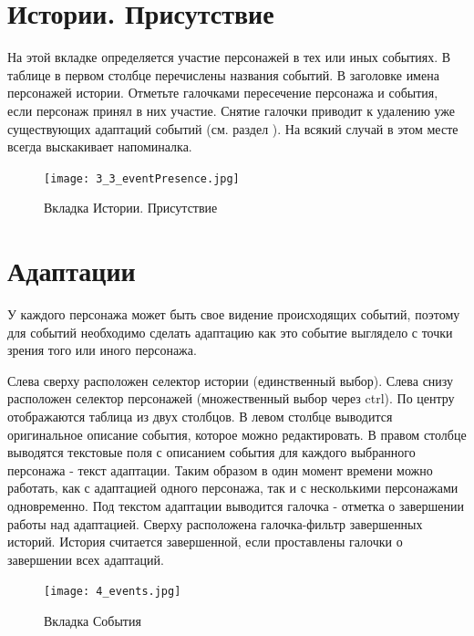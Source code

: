 \documentclass[a4paper,oneside,10pt,russian]{sphinxmanual}
\begin{document}
\section{Истории. Присутствие}
\label{pages:id10}\label{pages:story-presence}
На этой вкладке определяется участие персонажей в тех или иных событиях. В таблице в первом столбце перечислены названия событий. В заголовке имена персонажей истории. Отметьте галочками пересечение персонажа и события, если персонаж принял в них участие. Снятие галочки приводит к удалению уже существующих адаптаций событий (см. раздел {\hyperref[pages:events-desc]{\emph{}}}). На всякий случай в этом месте всегда выскакивает напоминалка.
\begin{figure}[H]
\centering
\capstart

\texttt{[image: 3\_3\_eventPresence.jpg]}
\caption{Вкладка Истории. Присутствие}\end{figure}
\newpage

\section{Адаптации}
\label{pages:id11}\label{pages:events-desc}
У каждого персонажа может быть свое видение происходящих событий, поэтому для событий необходимо сделать адаптацию как это событие выглядело с точки зрения того или иного персонажа.

Слева сверху расположен селектор истории (единственный выбор). Слева снизу расположен селектор персонажей (множественный выбор через ctrl). По центру отображаются таблица из двух столбцов. В левом столбце выводится оригинальное описание события, которое можно редактировать. В правом столбце выводятся текстовые поля с описанием события для каждого выбранного персонажа - текст адаптации. Таким образом в один момент времени можно работать, как с адаптацией одного персонажа, так и с несколькими персонажами одновременно. Под текстом адаптации выводится галочка - отметка о завершении работы над адаптацией. Сверху расположена галочка-фильтр завершенных историй. История считается завершенной, если проставлены галочки о завершении всех адаптаций.
\begin{figure}[H]
\centering
\capstart

\texttt{[image: 4\_events.jpg]}
\caption{Вкладка События}\end{figure}
\newpage
\end{document}
